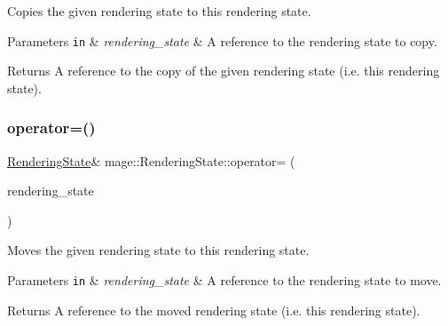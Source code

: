 Copies the given rendering state to this rendering state.


\begin{DoxyParams}[1]{Parameters}
\mbox{\tt in}  & {\em rendering\+\_\+state} & A reference to the rendering state to copy. \\
\hline
\end{DoxyParams}
\begin{DoxyReturn}{Returns}
A reference to the copy of the given rendering state (i.\+e. this rendering state). 
\end{DoxyReturn}
\hypertarget{structmage_1_1_rendering_state_ad16e9963683b1eda6cbe675b8b210368}{}\label{structmage_1_1_rendering_state_ad16e9963683b1eda6cbe675b8b210368} 
\subsubsection{\texorpdfstring{operator=()}{operator=()}\hspace{0.1cm}{\footnotesize\ttfamily [2/2]}}
{\footnotesize\ttfamily \hyperlink{structmage_1_1_rendering_state}{Rendering\+State}\& mage\+::\+Rendering\+State\+::operator= (\begin{DoxyParamCaption}\item[{\hyperlink{structmage_1_1_rendering_state}{Rendering\+State} \&\&}]{rendering\+\_\+state }\end{DoxyParamCaption})\hspace{0.3cm}{\ttfamily [delete]}}

Moves the given rendering state to this rendering state.


\begin{DoxyParams}[1]{Parameters}
\mbox{\tt in}  & {\em rendering\+\_\+state} & A reference to the rendering state to move. \\
\hline
\end{DoxyParams}
\begin{DoxyReturn}{Returns}
A reference to the moved rendering state (i.\+e. this rendering state). 
\end{DoxyReturn}
\hypertarget{structmage_1_1_rendering_state_ac685d7f5b0832bc4af9e09ed3f50bf22}{}\label{structmage_1_1_rendering_state_ac685d7f5b0832bc4af9e09ed3f50bf22} 
